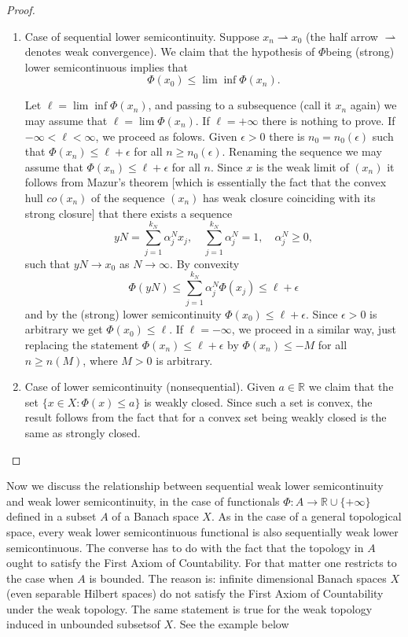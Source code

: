 \begin{proof}
\begin{enumerate}
\renewcommand{\theenumi}{\roman{enumi}}
\renewcommand{\labelenumi}{(\theenumi)}
\item Case of sequential lower semicontinuity. Suppose
  $x_{n}\rightharpoonup x_{0}$ (the half arrow $\rightharpoonup$
  denotes weak convergence). We claim that the hypothesis of
  $\Phi$\pageoriginale being (strong) lower semicontinuous implies
  that
$$
\Phi(x_{0})\leq \lim\inf\Phi(x_{n}).
$$

Let $\ell=\lim\inf\Phi(x_{n})$, and passing to a subsequence (call it
$x_{n}$ again) we may assume that $\ell=\lim\Phi(x_{n})$. If
$\ell=+\infty$ there is nothing to prove. If $-\infty<\ell<\infty$, we
proceed as folows. Given $\epsilon>0$ there is $n_{0}=n_{0}(\epsilon)$
such that $\Phi(x_{n})\leq \ell+\epsilon$ for all $n\geq
n_{0}(\epsilon)$. Renaming the sequence we may assume that
$\Phi(x_{n})\leq \ell+\epsilon$ for all $n$. Since $x$ is the weak
limit of $(x_{n})$ it follows from Mazur's theorem [which is
  essentially the fact that the convex hull $co(x_{n})$ of the
  sequence $(x_{n})$ has weak closure coinciding with its strong
  closure] that there exists a sequence
$$
yN=\sum\limits^{k_{N}}_{j=1}\alpha^{N}_{j}x_{j},\quad
\sum\limits^{k_{N}}_{j=1}\alpha^{N}_{j}=1,\quad \alpha^{N}_{j}\geq 0,
$$
such that $yN\to x_{0}$ as $N\to \infty$. By convexity
$$
\Phi(yN)\leq \sum\limits^{k_{N}}_{j=1}\alpha^{N}_{j}\Phi(x_{j})\leq
\ell +\epsilon
$$
and by the (strong) lower semicontinuity $\Phi(x_{0})\leq
\ell+\epsilon$. Since $\epsilon>0$ is arbitrary we get
$\Phi(x_{0})\leq \ell$. If $\ell=-\infty$, we proceed in a similar
way, just replacing the statement $\Phi(x_{n})\leq \ell+\epsilon$ by
$\Phi(x_{n})\leq -M$ for all $n\geq n(M)$, where $M>0$ is arbitrary.

\item Case of lower semicontinuity (nonsequential). Given $a\in
  \mathbb{R}$ we claim that the set $\{x\in X:\Phi(x)\leq a\}$ is
  weakly closed. Since such a set is convex, the result follows from
  the fact that for a convex set being weakly closed is the same as
  strongly closed.
\end{enumerate}
\end{proof}

Now we discuss the relationship between sequential weak lower
semicontinuity and weak lower semicontinuity, in the case of
functionals $\Phi:A\to \mathbb{R}\cup \{+\infty\}$ defined in a subset
$A$ of a Banach space $X$. As in the case of a general topological
space, every weak lower semicontinuous functional is also sequentially
weak lower semicontinuous. The converse has to do with the fact that
the topology in $A$ ought to satisfy the First Axiom of
Countability. For that matter one restricts to the case when $A$ is
bounded. The reason is: infinite dimensional Banach spaces $X$ (even
separable Hilbert spaces) do not satisfy the First Axiom of
Countability under the weak topology. The same statement is true for
the weak topology induced in unbounded subsets\pageoriginale of
$X$. See the example below

